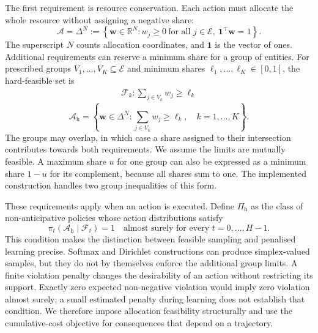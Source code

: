 \documentclass[10pt]{article}
\newcommand{\R}{\mathbb{R}}
\newcommand{\AllocSimplex}{\Delta^N}
\begin{document}
The first requirement is resource conservation. Each action must allocate the whole resource without assigning a negative share:
\begin{equation}
  \mathcal A=\AllocSimplex
    :=\left\{\bm w\in\R^N:
       w_j\geq0\ \text{for all }j\in\mathcal E,\
       \mathbf1^\top\bm w=1\right\}.
  \label{eq:allocation-simplex}
\end{equation}
The superscript $N$ counts allocation coordinates, and $\mathbf1$ is the vector of ones. Additional requirements can reserve a minimum share for a group of entities. For  prescribed groups $V_1,\ldots, V_K\subseteq\mathcal E$ and minimum shares $\ell_1,\ldots, \ell_K\in[0,1]$, the hard-feasible set is
\begin{align}
    \mathcal{F}_k: \sum_{j\in V_k}w_j\geq\ell_k
\end{align}
\begin{equation}
  \mathcal A_{\mathrm h}
    =\left\{\bm w\in\AllocSimplex:
       \sum_{j\in V_k}w_j\geq\ell_k,\quad k=1,\ldots, K\right\}.
  \label{eq:hard-action-set}
\end{equation}
The groups may overlap, in which case a share assigned to their intersection contributes towards both requirements. We assume the limits are mutually feasible. A maximum share $u$ for one group can also be expressed as a minimum share $1-u$ for its complement, because all shares sum to one. The implemented construction handles two group inequalities of this form.

These requirements apply when an action is executed. Define $\Pi_{\mathrm h}$ as the class of non-anticipative policies whose action distributions satisfy
\begin{equation}
  \pi_t(\mathcal A_{\mathrm h}\mid\mathcal F_t)=1
  \quad\text{almost surely for every }t=0,\ldots,H-1.
  \label{eq:hard-feasibility}
\end{equation}
This condition makes the distinction between feasible sampling and penalised learning precise. Softmax and Dirichlet constructions can produce simplex-valued samples, but they do not by themselves enforce the additional group limits. A finite violation penalty changes the desirability of an action without restricting its support. Exactly zero expected non-negative violation would imply zero violation almost surely; a small estimated penalty during learning does not establish that condition. We therefore impose allocation feasibility structurally and use the cumulative-cost objective for consequences that depend on a trajectory.
\end{document}
